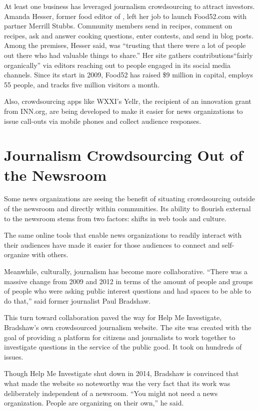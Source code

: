 \begin{itemize}
At least one business has leveraged journalism crowdsourcing to attract investors. Amanda Hesser, former food editor of , left her job to launch Food52.com with partner Merrill Stubbs. Community members send in recipes, comment on recipes, ask and answer cooking questions, enter contests, and send in blog posts. Among the premises, Hesser said, was ``trusting that there were a lot of people out there who had valuable things to share.''
Her site gathers contributions``fairly organically'' via editors reaching out to people engaged in its social media channels. Since its start in 2009, Food52 has raised \$9 million in capital, employs 55 people, and tracks five million visitors a month.\autocite{Hesser}

Also, crowdsourcing apps like WXXI’s Yellr, the recipient of an innovation grant from INN.org, are being developed to make it easier for news organizations to issue call-outs via mobile phones and collect audience responses. 

\chapter{Journalism Crowdsourcing Out of the Newsroom}

Some news organizations are seeing the benefit of situating crowdsourcing outside of the newsroom and directly within communities. Its ability to flourish external to the newsroom stems from two factors: shifts in web tools and culture. 

The same online tools that enable news organizations to readily interact with their audiences have made it easier for those audiences to connect and self-organize with others.

Meanwhile, culturally, journalism has become more collaborative. ``There was a massive change from 2009 and 2012 in terms of the amount of people and groups of people who were asking public interest questions and had spaces to be able to do that,'' said former  journalist Paul Bradshaw.\autocite{Bradshaw}

This turn toward collaboration paved the way for Help Me Investigate, Bradshaw’s own crowdsourced journalism website.\autocite{HMI} The site was created with the goal of providing a platform for citizens and journalists to work together to investigate questions in the service of the public good. It took on hundreds of issues.

Though Help Me Investigate shut down in 2014, Bradshaw is convinced that what made the website so noteworthy was the very fact that its work was deliberately independent of a newsroom. ``You might not need a news organization. People are organizing on their own,'' he said. 


\end{itemize}
